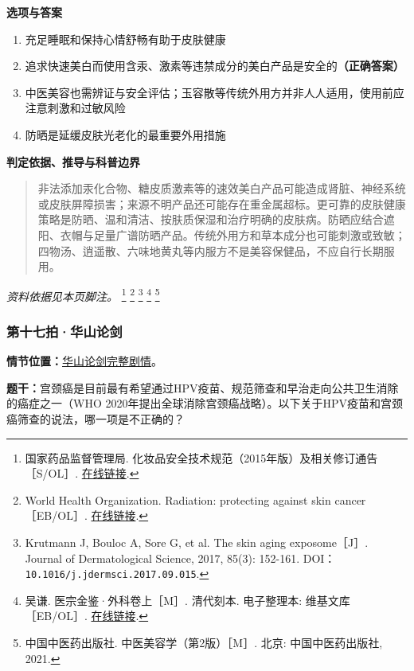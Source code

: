 \textbf{选项与答案}
\begin{enumerate}[label=\Alph*.,leftmargin=*]
  \item 充足睡眠和保持心情舒畅有助于皮肤健康
  \item 追求快速美白而使用含汞、激素等违禁成分的美白产品是安全的\textbf{（正确答案）}
  \item 中医美容也需辨证与安全评估；玉容散等传统外用方并非人人适用，使用前应注意刺激和过敏风险
  \item 防晒是延缓皮肤光老化的最重要外用措施
\end{enumerate}
\textbf{判定依据、推导与科普边界}
\begin{quote}非法添加汞化合物、糖皮质激素等的速效美白产品可能造成肾脏、神经系统或皮肤屏障损害；来源不明产品还可能存在重金属超标。更可靠的皮肤健康策略是防晒、温和清洁、按肤质保湿和治疗明确的皮肤病。防晒应结合遮阳、衣帽与足量广谱防晒产品。传统外用方和草本成分也可能刺激或致敏；四物汤、逍遥散、六味地黄丸等内服方不是美容保健品，不应自行长期服用。\end{quote}
\noindent\textit{资料依据见本页脚注。}
\footnote{国家药品监督管理局. 化妆品安全技术规范（2015年版）及相关修订通告［S/OL］. \href{https://www.nmpa.gov.cn/}{在线链接}.}
\footnote{World Health Organization. Radiation: protecting against skin cancer［EB/OL］. \href{https://www.who.int/news-room/questions-and-answers/item/radiation-protecting-against-skin-cancer}{在线链接}.}
\footnote{Krutmann J, Bouloc A, Sore G, et al. The skin aging exposome［J］. Journal of Dermatological Science, 2017, 85(3): 152-161. DOI：\nolinkurl{10.1016/j.jdermsci.2017.09.015}.}
\footnote{吴谦. 医宗金鉴·外科卷上［M］. 清代刻本. 电子整理本: 维基文库［EB/OL］. \href{https://zh.wikisource.org/zh-hans/醫宗金鑑/外科卷上}{在线链接}.}
\footnote{中国中医药出版社. 中医美容学（第2版）［M］. 北京: 中国中医药出版社, 2021.}

\subsubsection{第十七拍·华山论剑}\label{question:zhouzhiruo:17}
\textbf{情节位置：}\hyperref[plot:zhouzhiruo:17]{华山论剑完整剧情}。

\textbf{题干：}宫颈癌是目前最有希望通过HPV疫苗、规范筛查和早治走向公共卫生消除的癌症之一（WHO 2020年提出全球消除宫颈癌战略）。以下关于HPV疫苗和宫颈癌筛查的说法，哪一项是不正确的？

